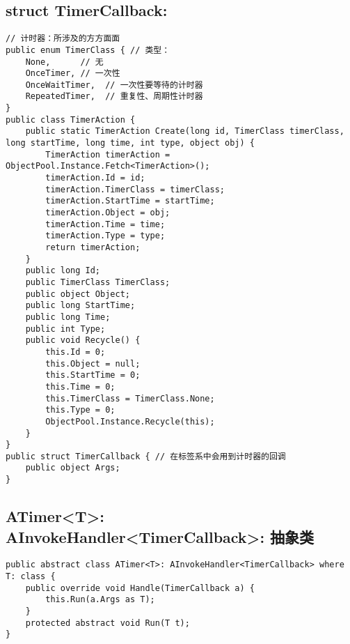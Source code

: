 \documentclass[9pt, b5paper]{article}
\begin{document}
\subsection{struct TimerCallback:}
\label{sec-2-19}
\begin{verbatim}
// 计时器：所涉及的方方面面
public enum TimerClass { // 类型：
    None,      // 无
    OnceTimer, // 一次性
    OnceWaitTimer,  // 一次性要等待的计时器
    RepeatedTimer,  // 重复性、周期性计时器
}
public class TimerAction {
    public static TimerAction Create(long id, TimerClass timerClass, long startTime, long time, int type, object obj) {
        TimerAction timerAction = ObjectPool.Instance.Fetch<TimerAction>();
        timerAction.Id = id;
        timerAction.TimerClass = timerClass;
        timerAction.StartTime = startTime;
        timerAction.Object = obj;
        timerAction.Time = time;
        timerAction.Type = type;
        return timerAction;
    }
    public long Id;
    public TimerClass TimerClass;
    public object Object;
    public long StartTime;
    public long Time;
    public int Type;
    public void Recycle() {
        this.Id = 0;
        this.Object = null;
        this.StartTime = 0;
        this.Time = 0;
        this.TimerClass = TimerClass.None;
        this.Type = 0;
        ObjectPool.Instance.Recycle(this);
    }
}
public struct TimerCallback { // 在标签系中会用到计时器的回调
    public object Args;
}
\end{verbatim}
\subsection{ATimer<T>: AInvokeHandler<TimerCallback>: 抽象类}
\label{sec-2-20}
\begin{verbatim}
public abstract class ATimer<T>: AInvokeHandler<TimerCallback> where T: class {
    public override void Handle(TimerCallback a) {
        this.Run(a.Args as T);
    }
    protected abstract void Run(T t);
}
\end{verbatim}
\end{document}
